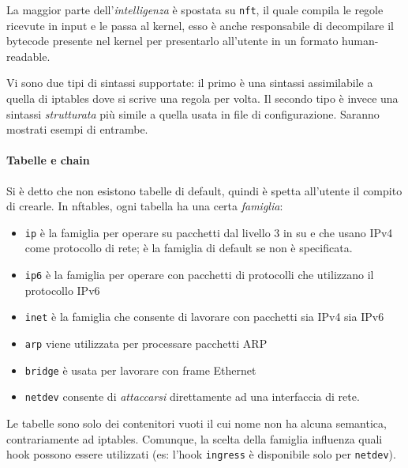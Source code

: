 La maggior parte dell'\textit{intelligenza} è spostata su \texttt{nft}, il quale compila
le regole ricevute in input e le passa al kernel, esso è anche responsabile di
decompilare il bytecode presente nel kernel per presentarlo all'utente in un
formato human-readable.

Vi sono due tipi di sintassi supportate: il primo è una sintassi assimilabile a quella
di iptables dove si scrive una regola per volta. Il secondo tipo è invece
una sintassi \textit{strutturata} più simile a quella usata in
file di configurazione. Saranno mostrati esempi di entrambe.


\paragraph{Tabelle e chain}
Si è detto che non esistono tabelle di default, quindi è spetta all'utente
il compito di crearle. In nftables, ogni tabella ha una certa \textit{famiglia}:
\begin{itemize}
	\item \texttt{ip} è la famiglia per operare su pacchetti dal livello 3 in su e
	      che usano IPv4 come protocollo di rete; è la famiglia di default se non è specificata.
	\item \texttt{ip6} è la famiglia per operare con pacchetti di protocolli che utilizzano
		il protocollo IPv6
	\item \texttt{inet} è la famiglia che consente di lavorare con pacchetti sia IPv4
	      sia IPv6
	\item \texttt{arp} viene utilizzata per processare pacchetti ARP
	\item \texttt{bridge} è usata per lavorare con frame Ethernet
	\item \texttt{netdev} consente di \textit{attaccarsi} direttamente ad una interfaccia
	      di rete.
\end{itemize}
Le tabelle sono solo dei contenitori vuoti il cui nome non ha alcuna semantica, contrariamente
ad iptables. Comunque, la scelta della famiglia influenza quali hook possono
essere utilizzati (es: l'hook \texttt{ingress} è disponibile solo per \texttt{netdev}).

